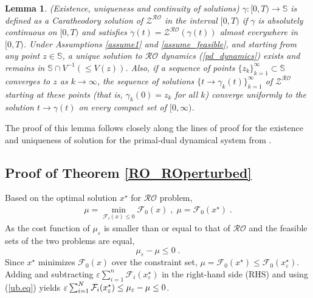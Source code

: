 \documentclass[journal,twoside,web]{ieeecolor}
\newcommand{\rev}[1]{\textcolor{revisionblue}{#1}}
\newtheorem{lemma}{Lemma}
\begin{document}
\begin{lemma} \label{uniq_exis}
(Existence, uniqueness and continuity of solutions)
$\gamma:[0,T) \rightarrow {\mathbb S}$ is defined as a Caratheodory solution of $\mathcal{Z}^{\mathcal{RO}}$ in the interval $[0,T)$ if $\gamma$ is absolutely continuous on $[0,T)$ and satisfies $\dot \gamma(t)=\mathcal{Z}^{\mathcal{RO}} (\gamma(t))$ almost everywhere in $[0,T)$.
Under Assumptions \ref{assume1} and \ref{assume_feasible}, and starting from any point $z\in \mathbb S$, a unique solution to $\mathcal{RO}$ dynamics (\ref{pd_dynamics}) exists and remains in $\mathbb S \cap V^{-1}(\leq V(z))$. Also, if a sequence of points $\{z_k\}_{k=1}^\infty \subset {\mathbb S}$ converges to $z$ as $k \rightarrow \infty$, the sequence of solutions $\{t \rightarrow \gamma_k(t)\}_{k=1}^\infty$ of $\mathcal{Z}^{\mathcal{RO}}$ starting at these points (that is, $\gamma_k(0)=z_k$ for all $k$) converge uniformly to the solution $t \rightarrow \gamma(t)$ on every compact set of $[0,\infty)$.
\end{lemma}
The proof of this lemma follows closely along the lines of proof for the existence and uniqueness of solution for the primal-dual dynamical system from \cite[Lemma~4.3]{cherukuri2016}.


\subsection*{\rev{Proof of Theorem \ref{RO_ROperturbed}}}

Based on the optimal solution $x^\star$ for $\mathcal{RO}$ problem,
\begin{align*}
\mu=\min_{\mathcal{F}_i(x)\leq  0} \mathcal{F}_0(x)\;,\; \mu=\mathcal{F}_0(x^\star)\;.
\end{align*}
As the cost function of $\mu_\varepsilon$ is smaller than or equal to that of $\mathcal{RO}$ and the feasible sets of the two problems are equal,
\begin{equation}\label{ub.eq}
 \mu_\varepsilon-\mu\leq 0\;.
\end{equation}
Since $x^\star$ minimizes $\mathcal{F}_0(x)$ over the constraint set, $\mu=\mathcal{F}_0(x^\star)\leq \mathcal{F}_0(x_\varepsilon^\star)$.
Adding and subtracting $\varepsilon\sum_{i=1}^n\mathcal{F}_i(x^\star_\varepsilon)$
in the right-hand side (RHS) and using (\ref{ub.eq}) yields $\varepsilon \sum_{i=1}^N{\cal F}_{i}(x_\varepsilon^\star)\leq
\mu_\varepsilon-\mu\leq 0$\;.
\end{document}
